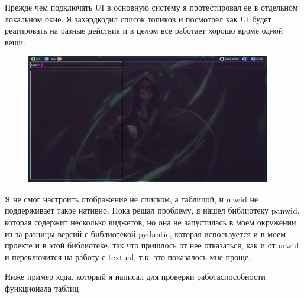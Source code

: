 \documentclass[10pt , a4paper]{report}
\begin{document}
Прежде чем подключать UI в основную систему я протестировал ее в отдельном локальном окне. Я захардкодил список топиков и посмотрел как UI будет реагировать на разные действия и в целом все работает хорошо кроме одной вещи. 

\newpage
\begin{figure}[htbp]
  \begin{center}
    \includegraphics[width=0.95\textwidth]{imgs/UIFirstScreen.png}
  \end{center}
  \caption{}\label{fig:}
\end{figure}

Я не смог настроить отображение не списком, а таблицой, и urwid не поддерживает такое нативно. Пока решал проблему, я нашел библиотеку panwid, которая содержит несколько виджетов, но она не запустилась в моем окружении из-за разницы версий с библиотекой pydantic, которая используется и в моем проекте и в этой библиотеке, так что пришлось от нее отказаться, как и от urwid и переключится на работу с textual, т.к. это показалось мне проще.

Ниже пример кода, который я написал для проверки работаспособности функционала таблиц
\end{document}
